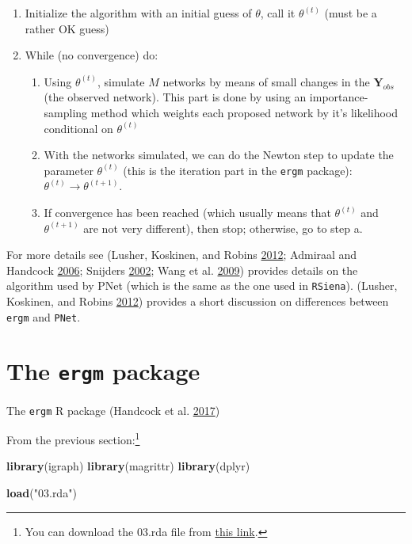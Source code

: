 \documentclass[]{book}
\newenvironment{Shaded}{\begin{snugshade}}{\end{snugshade}}
\newcommand{\KeywordTok}[1]{\textcolor[rgb]{0.13,0.29,0.53}{\textbf{#1}}}
\newcommand{\NormalTok}[1]{#1}
\newcommand{\StringTok}[1]{\textcolor[rgb]{0.31,0.60,0.02}{#1}}
\begin{document}
\begin{enumerate}
\def\labelenumi{\arabic{enumi}.}
\item
  Initialize the algorithm with an initial guess of \(\theta\), call it \(\theta^{(t)}\) (must be a rather OK guess)
\item
  While (no convergence) do:

  \begin{enumerate}
  \def\labelenumii{\alph{enumii}.}
  \item
    Using \(\theta^{(t)}\), simulate \(M\) networks by means of small changes in the \(\mathbf{Y}_{obs}\) (the observed network). This part is done by using an importance-sampling method which weights each proposed network by it's likelihood conditional on \(\theta^{(t)}\)
  \item
    With the networks simulated, we can do the Newton step to update the parameter \(\theta^{(t)}\) (this is the iteration part in the \texttt{ergm} package): \(\theta^{(t)}\to\theta^{(t+1)}\).
  \item
    If convergence has been reached (which usually means that \(\theta^{(t)}\) and \(\theta^{(t + 1)}\) are not very different), then stop; otherwise, go to step a.
  \end{enumerate}
\end{enumerate}

For more details see (Lusher, Koskinen, and Robins \protect\hyperlink{ref-lusher2012}{2012}; Admiraal and Handcock \protect\hyperlink{ref-admiraal2006}{2006}; Snijders \protect\hyperlink{ref-Snijders2002}{2002}; Wang et al. \protect\hyperlink{ref-Wang2009}{2009}) provides details on the algorithm used by PNet (which is the same as the one used in \texttt{RSiena}). (Lusher, Koskinen, and Robins \protect\hyperlink{ref-lusher2012}{2012}) provides a short discussion on differences between \texttt{ergm} and \texttt{PNet}.

\hypertarget{the-ergm-package}{%
\section{\texorpdfstring{The \texttt{ergm} package}{The ergm package}}\label{the-ergm-package}}

The \texttt{ergm} R package (Handcock et al. \protect\hyperlink{ref-R-ergm}{2017})

From the previous section:\footnote{You can download the 03.rda file from \href{https://github.com/gvegayon/appliedsnar}{this link}.}

\begin{Shaded}
\begin{Highlighting}[]
\KeywordTok{library}\NormalTok{(igraph)}
\KeywordTok{library}\NormalTok{(magrittr)}
\KeywordTok{library}\NormalTok{(dplyr)}

\KeywordTok{load}\NormalTok{(}\StringTok{"03.rda"}\NormalTok{)}
\end{Highlighting}
\end{Shaded}
\end{document}
